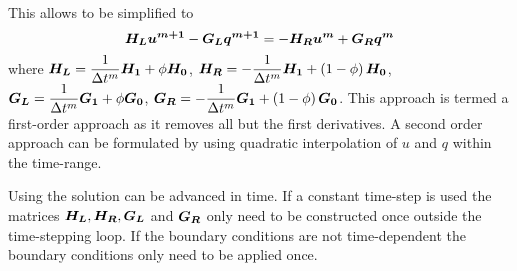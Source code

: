 This allows  to be simplified to
\begin{equation}
\matr{H_{l}} \vect{u^{m+1}} - \matr{G_{l}} \vect{q^{m+1}} = - \matr{H_{r}} \vect{u^{m}} + \matr{G_{r}} \vect{q^{m}}
\label{eq:firstorder}
\end{equation}
where $\matr{H_{l}} = \dfrac{1}{\Delta t^{m}} \matr{H_{1}} + \phi
\matr{H_{0}}$, $\matr{H_{r}} = - \dfrac{1}{\Delta t^{m}} \matr{H_{1}} +
\pbrac{1-\phi} \matr{H_{0}}$, $\matr{G_{l}} = \dfrac{1}{\Delta t^{m}}
\matr{G_{1}} + \phi \matr{G_{0}}$, $\matr{G_{r}} = - \dfrac{1}{\Delta t^{m}}
\matr{G_{1}}+ \pbrac{1-\phi} \matr{G_{0}}$.  This approach is termed a first-order
approach as it removes all but the first derivatives.  A second order approach
can be formulated by using quadratic interpolation of $u$ and $q$ within the
time-range.

Using  the solution can be advanced in time.  If a
constant time-step is used the matrices $\matr{H_{l}}, \matr{H_{r}},
\matr{G_{l}}$ and $\matr{G_{r}}$ only need to be constructed once outside the
time-stepping loop.  If the boundary conditions are not time-dependent the
boundary conditions only need to be applied once.

